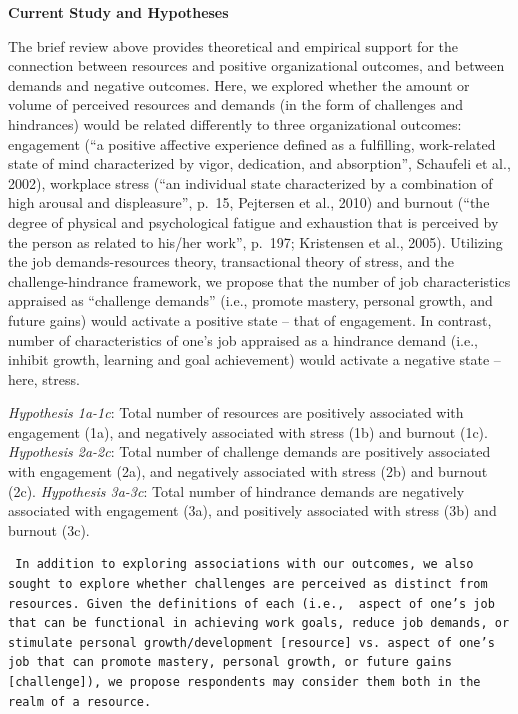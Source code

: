 \documentclass[
  man]{apa6}
\begin{document}
\textbf{Current Study and Hypotheses}

The brief review above provides theoretical and empirical support for the connection between resources and positive organizational outcomes, and between demands and negative outcomes. Here, we explored whether the amount or volume of perceived resources and demands (in the form of challenges and hindrances) would be related differently to three organizational outcomes: engagement (``a positive affective experience defined as a fulfilling, work-related state of mind characterized by vigor, dedication, and absorption'', Schaufeli et al., 2002), workplace stress (``an individual state characterized by a combination of high arousal and displeasure'', p.~15, Pejtersen et al., 2010) and burnout (``the degree of physical and psychological fatigue and exhaustion that is perceived by the person as related to his/her work'', p.~197; Kristensen et al., 2005). Utilizing the job demands-resources theory, transactional theory of stress, and the challenge-hindrance framework, we propose that the number of job characteristics appraised as ``challenge demands'' (i.e., promote mastery, personal growth, and future gains) would activate a positive state -- that of engagement. In contrast, number of characteristics of one's job appraised as a hindrance demand (i.e., inhibit growth, learning and goal achievement) would activate a negative state -- here, stress.

\emph{Hypothesis 1a-1c}: Total number of resources are positively associated with engagement (1a), and negatively associated with stress (1b) and burnout (1c).
\emph{Hypothesis 2a-2c}: Total number of challenge demands are positively associated with engagement (2a), and negatively associated with stress (2b) and burnout (2c).
\emph{Hypothesis 3a-3c}: Total number of hindrance demands are negatively associated with engagement (3a), and positively associated with stress (3b) and burnout (3c).

\begin{verbatim}
 In addition to exploring associations with our outcomes, we also sought to explore whether challenges are perceived as distinct from resources. Given the definitions of each (i.e.,  aspect of one’s job that can be functional in achieving work goals, reduce job demands, or stimulate personal growth/development [resource] vs. aspect of one’s job that can promote mastery, personal growth, or future gains [challenge]), we propose respondents may consider them both in the realm of a resource. 
 
\end{verbatim}
\end{document}
